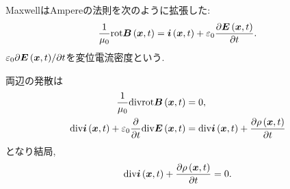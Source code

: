 \documentclass[10pt,a4paper]{jsarticle}
\begin{document}
MaxwellはAmpereの法則を次のように拡張した: 
\begin{align*}
    \frac{1}{\mu_0 } \mathrm{rot} \bm{B} \left( \bm{x}, t \right) = \bm{i} \left( \bm{x}, t \right) + \varepsilon_0 \frac{\partial \bm{E} \left( \bm{x}, t \right)}{\partial t}.
\end{align*}
$\varepsilon_0 {\partial \bm{E} \left( \bm{x}, t \right)}/{\partial t}$を変位電流密度という. \par
両辺の発散は
\begin{align*}
    \frac{1}{\mu_0} \mathrm{div} \mathrm{rot} \bm{B} \left( \bm{x}, t \right) &= 0,\\
    \mathrm{div} \bm{i} \left( \bm{x}, t \right) + \varepsilon_0 \frac{\partial}{\partial t} \mathrm{div} \bm{E} \left( \bm{x}, t \right) &= \mathrm{div} \bm{i} \left( \bm{x}, t \right) + \frac{\partial \rho \left( \bm{x}, t \right) }{\partial t}
\end{align*}
となり結局, 
\begin{align*}
    \mathrm{div} \bm{i} \left( \bm{x}, t \right) + \frac{\partial \rho \left( \bm{x}, t \right) }{\partial t} = 0.
\end{align*}
\end{document}
